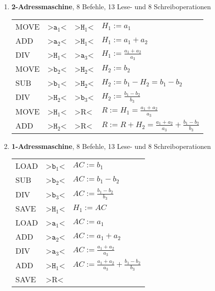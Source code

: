 \documentclass[a4paper,11pt]{scrartcl}
\begin{document}
\begin{enumerate}[\bf a)]
    \item
        \textbf{2-Adressmaschine}, 8 Befehle, 13 Lese- und 8 Schreiboperationen\\
        \begin{tabular}{>{\ttfamily}p{1cm} >{\ttfamily}p{1cm} >{\ttfamily}p{2cm} | >{\ttfamily}p{5cm}}
            MOVE & >$\mathtt a_1$< & >$\mathtt H_1$< & $H_1 := a_1$ \\
            ADD  & >$\mathtt a_2$< & >$\mathtt H_1$< & $H_1 := a_1 + a_2$\\
            DIV  & >$\mathtt H_1$< & >$\mathtt a_3$< & $H_1 := \frac{a_1 + a_2}{a_3}$\\
            MOVE & >$\mathtt b_2$< & >$\mathtt H_2$< & $H_2 := b_2$\\
            SUB  & >$\mathtt b_1$< & >$\mathtt H_2$< & $H_2 := b_1 - H_2 = b_1 - b_2$\\
            DIV  & >$\mathtt H_2$< & >$\mathtt b_3$< & $H_2 := \frac{b_1 - b_2}{b_3}$\\
            MOVE & >$\mathtt H_1$< & >R<             & $R := H_1 = \frac{a_1 + a_2}{a_3}$\\
            ADD  & >$\mathtt H_2$< & >R<             & $R := R + H_2 = \frac{a_1 + a_2}{a_3} + \frac{b_1 - b_2}{b_3}$
        \end{tabular}

    \item
        \textbf{1-Adressmaschine}, 8 Befehle, 13 Lese- und 8 Schreiboperationen\\
        \begin{tabular}{>{\ttfamily}p{1cm} >{\ttfamily}p{3.46cm} | >{\ttfamily}p{5cm}}
            LOAD & >$\mathtt b_1$< & $AC := b_1$\\
            SUB  & >$\mathtt b_2$< & $AC := b_1 - b_2$\\
            DIV  & >$\mathtt b_3$< & $AC := \frac{b_1-b_2}{b_3}$\\
            SAVE & >$\mathtt H_1$< & $H_1 := AC$\\
            LOAD & >$\mathtt a_1$< & $AC := a_1$\\
            ADD  & >$\mathtt a_2$< & $AC := a_1 + a_2$\\
            DIV  & >$\mathtt a_3$< & $AC := \frac{a_1 + a_2}{a_3}$\\
            ADD  & >$\mathtt H_1$< & $AC := \frac{a_1 + a_2}{a_3} + \frac{b_1-b_2}{b_3}$\\
            SAVE & >R<
        \end{tabular}


\end{enumerate}
\end{document}
